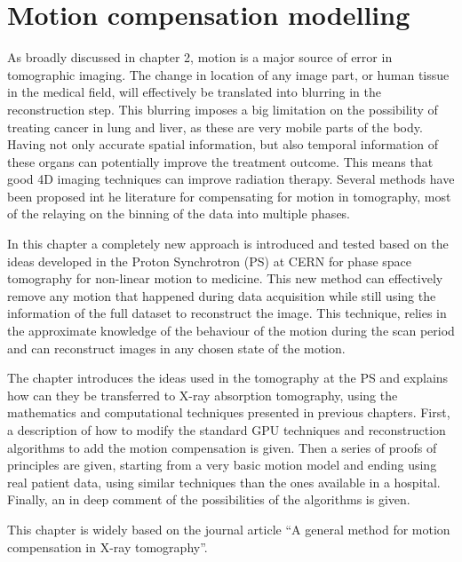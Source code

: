 \chapter{Motion compensation modelling}\label{ch:motion}

As broadly discussed in chapter 2, motion is a major source of error in tomographic imaging. The change in location of any image part, or human tissue in the medical field, will effectively be translated into blurring in the reconstruction step. This blurring imposes a big limitation on the possibility of treating cancer in lung and liver, as these are very mobile parts of the body. Having not only accurate spatial information, but also temporal information of these organs can potentially improve the treatment outcome. This means that good 4D imaging techniques can improve radiation therapy. Several methods have been proposed int he literature for compensating for motion in tomography, most of the relaying on the binning of the data into multiple phases. 

In this chapter a completely new approach is introduced and tested based on the ideas developed in the Proton Synchrotron (PS) at CERN for phase space tomography for non-linear motion to medicine. This new method can effectively remove any motion that happened during data acquisition while still using the information of the full dataset to reconstruct the image. This technique, relies in the approximate knowledge of the behaviour of the motion during the scan period and can reconstruct images in any chosen state of the motion.

The chapter introduces the ideas used in the tomography at the PS and explains how can they be transferred to X-ray absorption tomography, using the mathematics and computational techniques presented in previous chapters. First, a description of how to modify the standard GPU techniques and reconstruction algorithms to add the motion compensation is given. Then a series of proofs of principles are given, starting from a very basic motion model and ending using real patient data, using similar techniques than the ones available in a hospital. Finally, an in deep comment of the possibilities of the algorithms is given.

This chapter is widely based on the journal article ``A general method for motion compensation in X-ray tomography''\cite{biguri2017general}.

